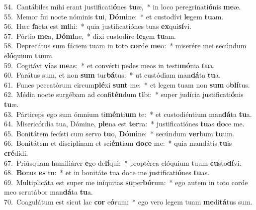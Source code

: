 {54.~}Cantábiles mihi erant justificati\textbf{ó}nes \textbf{tu}æ,~* in loco peregrinati\textbf{ó}nis \textbf{me}æ.\\
{55.~}Memor fui nocte nóminis \textbf{tu}i, \textbf{Dó}\textbf{mi}ne:~* et custodívi \textbf{le}gem \textbf{tu}am.\\
{56.~}Hæc \textbf{fa}cta est \textbf{mi}hi:~* quia justificatiónes tuas \textbf{ex}qui\textbf{sí}vi.\\
{57.~}Pórtio \textbf{me}a, \textbf{Dó}\textbf{mi}ne,~* dixi custodíre \textbf{le}gem \textbf{tu}am.\\
{58.~}Deprecátus sum fáciem tuam in toto \textbf{cor}de \textbf{me}o:~* miserére mei secúndum e\textbf{ló}quium \textbf{tu}um.\\
{59.~}Cogitávi \textbf{vi}as \textbf{me}as:~* et convérti pedes meos in testi\textbf{mó}nia \textbf{tu}a.\\
{60.~}Parátus sum, et non \textbf{sum} tur\textbf{bá}tus:~* ut custódiam man\textbf{dá}ta \textbf{tu}a.\\
{61.~}Funes peccatórum circum\textbf{plé}xi \textbf{sunt} me:~* et legem tuam non \textbf{sum} o\textbf{blí}tus.\\
{62.~}Média nocte surgébam ad confi\textbf{tén}dum \textbf{ti}bi:~* super judícia justificati\textbf{ó}nis \textbf{tu}æ.\\
{63.~}Párticeps ego sum ómnium ti\textbf{mén}ti\textbf{um} te:~* et custodiéntium man\textbf{dá}ta \textbf{tu}a.\\
{64.~}Misericórdia tua, Dómine, \textbf{ple}na est \textbf{ter}ra:~* justificatiónes \textbf{tu}as \textbf{do}ce me.\\
{65.~}Bonitátem fecísti cum servo \textbf{tu}o, \textbf{Dó}\textbf{mi}ne:~* secúndum \textbf{ver}bum \textbf{tu}um.\\
{66.~}Bonitátem et disciplínam et sci\textbf{én}tiam \textbf{do}\textbf{ce} me:~* quia mandátis \textbf{tu}is \textbf{cré}didi.\\
{67.~}Priúsquam humiliárer \textbf{e}go de\textbf{lí}qui:~* proptérea elóquium tuum \textbf{cu}sto\textbf{dí}vi.\\
{68.~}\textbf{Bo}nus \textbf{es} tu:~* et in bonitáte tua doce me justificati\textbf{ó}nes \textbf{tu}as.\\
{69.~}Multiplicáta est super me iníquitas \textbf{su}per\textbf{bó}rum:~* ego autem in toto corde meo scrutábor man\textbf{dá}ta \textbf{tu}a.\\
{70.~}Coagulátum est sicut lac \textbf{cor} e\textbf{ó}rum:~* ego vero legem tuam \textbf{me}di\textbf{tá}tus sum.\\
